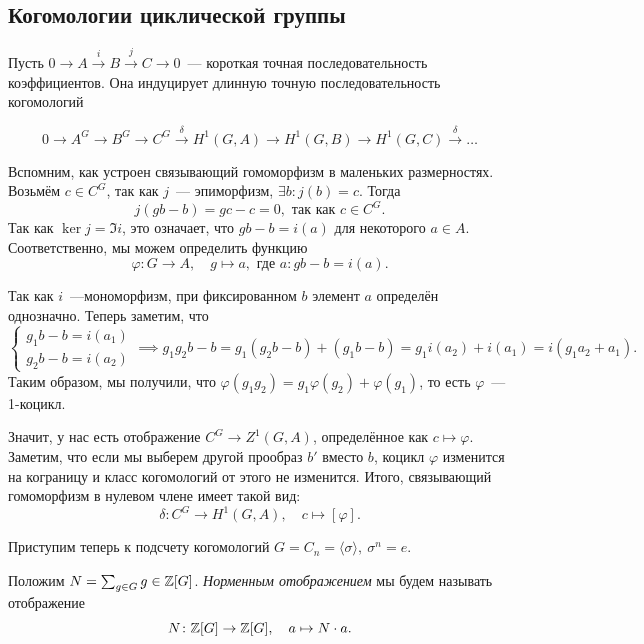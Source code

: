 
	\subsection{Когомологии циклической группы}

	Пусть $0 \to A \xrightarrow{i} B \xrightarrow{j} C \to 0$~--- короткая точная последовательность коэффициентов. Она индуцирует длинную точную последовательность когомологий

	\[
		0 \to A^G \to B^G \to C^G \xrightarrow{\delta} H^1(G, A) \to H^1(G, B) \to H^1(G, C) \xrightarrow{\delta} \ldots 
	\]

	Вспомним, как устроен связывающий гомоморфизм в маленьких размерностях. Возьмём $c \in C^G$, так как $j$~--- эпиморфизм, $\exists b\colon j(b) = c$. Тогда 
	\[
		j(gb - b) = gc - c = 0, \text{ так как } c \in C^G.
	\]
	Так как $\ker{j} = \Im{i}$, это означает, что $gb - b = i(a)$ для некоторого $a \in A$. Соответственно, мы можем определить функцию 
	\[
		\varphi\colon G \to A, \quad g \mapsto a, \text{ где } a\colon gb - b = i(a).
	\]


	Так как $i$~---мономорфизм, при фиксированном $b$ элемент $a$ определён однозначно. Теперь заметим, что  
	\[
		\begin{cases} g_1 b - b = i(a_1) \\ g_2 b - b = i(a_2)  \end{cases} \implies g_1 g_2 b - b = g_1(g_2 b - b) + (g_1 b - b) = g_1 i(a_2) + i(a_1) = i(g_1 a_2 + a_1).
	\]
	Таким образом, мы получили, что $\varphi(g_1g_2) = g_1 \varphi(g_2) + \varphi(g_1)$, то есть $\varphi$~--- 1-коцикл. 

	Значит, у нас есть отображение $C^{G} \to Z^{1}(G, A)$, определённое как $c \mapsto \varphi$. Заметим, что если мы выберем другой прообраз $b'$ вместо $b$, коцикл $\varphi$ изменится на кограницу и класс когомологий от этого не изменится. Итого, связывающий гомоморфизм в нулевом члене имеет такой вид: 
	\[
		\delta \colon C^{G} \to H^{1}(G, A), \quad c \mapsto [\varphi]. 
	\]

	Приступим теперь к подсчету когомологий $G = C_n = \langle \sigma \rangle, \ \sigma^n = e$. 

	\begin{definition} 
		Положим $N = \sum_{g \in G} g \in \mathbb{Z}[G]$. \emph{Норменным отображением} мы будем называть отображение 
		\[
			N\colon \mathbb{Z}[G] \to \mathbb{Z}[G], \quad a \mapsto N \cdot a. 
		\]
	\end{definition}

